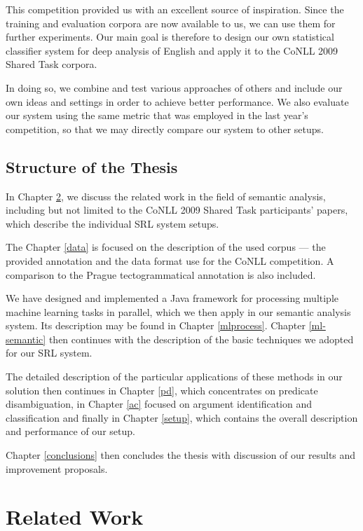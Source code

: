 \documentclass[12pt,notitlepage]{report}
\begin{document}
This competition provided us with an excellent source of inspiration. Since the training and evaluation corpora are now available to us, we can use them for further experiments. Our main goal is therefore to design our own statistical classifier system for deep analysis of English and apply it to the CoNLL 2009 Shared Task corpora. 

In doing so, we combine and test various approaches of others and include our own ideas and settings in order to achieve better performance. We also evaluate our system using the same metric that was employed in the last year's competition, so that we may directly compare our system to other setups.

\section{Structure of the Thesis}

In Chapter \ref{related}, we discuss the related work in the field of semantic analysis, including but not limited to the CoNLL 2009 Shared Task participants' papers, which describe the individual SRL system setups.

The Chapter \ref{data} is focused on the description of the used corpus --- the provided annotation and the data format use for the CoNLL competition. A comparison to the Prague tectogrammatical annotation \citep{cinkova09} is also included.

We have designed and implemented a Java framework for processing multiple machine learning tasks in parallel, which we then apply in our semantic analysis system. Its description may be found in Chapter \ref{mlprocess}. Chapter \ref{ml-semantic} then continues with the description of the basic techniques we adopted for our SRL system. 

The detailed description of the particular applications of these methods in our solution then continues in Chapter \ref{pd}, which concentrates on predicate disambiguation, in Chapter \ref{ac} focused on argument identification and classification and finally in Chapter \ref{setup}, which contains the overall description and performance of our setup.

Chapter \ref{conclusions} then concludes the thesis with discussion of our results and improvement proposals.

%
%
\chapter{Related Work}\label{related}
%
%
\end{document}
